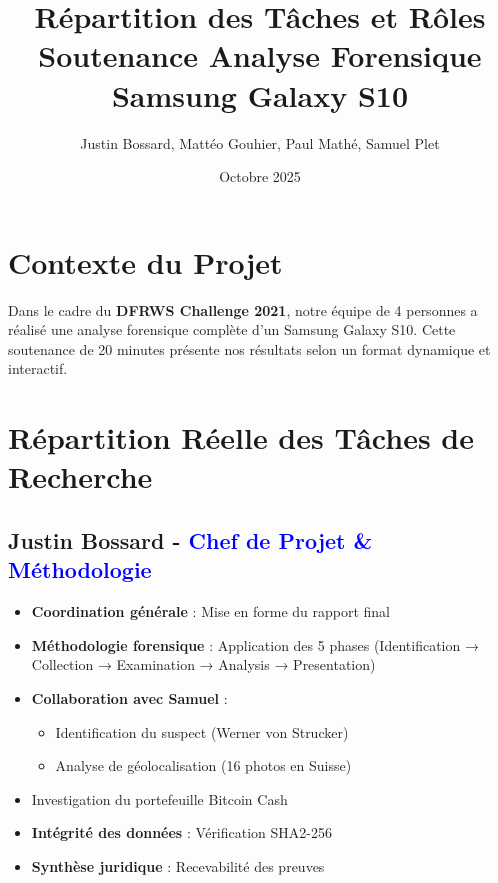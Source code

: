 \documentclass[11pt,a4paper]{article}
\title{\textbf{Répartition des Tâches et Rôles} \\ 
       \large Soutenance Analyse Forensique Samsung Galaxy S10}
\author{Justin Bossard, Mattéo Gouhier, Paul Mathé, Samuel Plet}
\date{Octobre 2025}
\begin{document}
\maketitle

\section{Contexte du Projet}

Dans le cadre du \textbf{DFRWS Challenge 2021}, notre équipe de 4 personnes a réalisé une analyse forensique complète d'un Samsung Galaxy S10. Cette soutenance de 20 minutes présente nos résultats selon un format dynamique et interactif.

\section{Répartition Réelle des Tâches de Recherche}

\subsection{Justin Bossard - \textcolor{blue}{Chef de Projet \& Méthodologie}}
\begin{itemize}[leftmargin=*]
    \item \textbf{Coordination générale} : Mise en forme du rapport final
    \item \textbf{Méthodologie forensique} : Application des 5 phases (Identification → Collection → Examination → Analysis → Presentation)
    \item \textbf{Collaboration avec Samuel} : 
    \begin{itemize}
        \item Identification du suspect (Werner von Strucker)
        \item Analyse de géolocalisation (16 photos en Suisse)
    \end{itemize}
    \item Investigation du portefeuille Bitcoin Cash
    \item \textbf{Intégrité des données} : Vérification SHA2-256
    \item \textbf{Synthèse juridique} : Recevabilité des preuves
\end{itemize}
\end{document}
